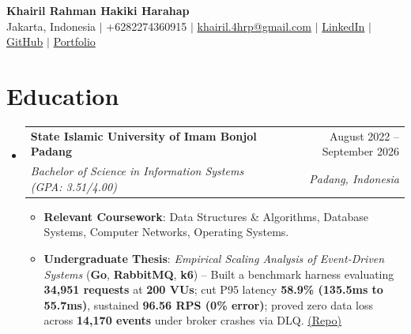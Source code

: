 \documentclass[letterpaper,11pt]{article}
\makeatletter
\newcommand{\resumeItem}[1]{\item\small{#1}}
\newcommand{\resumeSubheading}[4]{
  \item
    \begin{tabular*}{\textwidth}[t]{l@{\extracolsep{\fill}}r}
      \textbf{#1} & #2 \\
      \textit{\small#3} & \textit{\small #4} \\
    \end{tabular*}\vspace{-2pt}
}
\newcommand{\resumeSubHeadingListStart}{\begin{itemize}[leftmargin=0in, label={}, itemsep=0.5pt, parsep=0pt, topsep=0.2pt]}
\newcommand{\resumeSubHeadingListEnd}{\end{itemize}\vspace{-2pt}}
\newcommand{\resumeItemListStart}{\begin{itemize}[leftmargin=12pt, label=\tiny$\bullet$, itemsep=0.5pt, parsep=0pt, topsep=0.2pt]}
\newcommand{\resumeItemListEnd}{\end{itemize}}
\makeatother
\begin{document}
\begin{center}\vspace*{-4pt}
    {\LARGE \bfseries Khairil Rahman Hakiki Harahap} \\[2pt]
    \footnotesize Jakarta, Indonesia $|$ +6282274360915 $|$ \href{mailto:khairil.4hrp@gmail.com}{khairil.4hrp@gmail.com} $|$ \href{https://linkedin.com/in/khairilrahman}{LinkedIn} $|$ \href{https://github.com/kyyril}{GitHub} $|$ \href{https://kiril.is-a.dev}{Portfolio}
\end{center}\vspace{-4pt}



\section{Education}
  \resumeSubHeadingListStart
    \resumeSubheading
      {State Islamic University of Imam Bonjol Padang}{August 2022 -- September 2026}
      {Bachelor of Science in Information Systems (GPA: 3.51/4.00)}{Padang, Indonesia}
      \resumeItemListStart
        \resumeItem{\textbf{Relevant Coursework}: Data Structures \& Algorithms, Database Systems, Computer Networks, Operating Systems.}
        \resumeItem{\textbf{Undergraduate Thesis}: \emph{Empirical Scaling Analysis of Event-Driven Systems} (\textbf{Go}, \textbf{RabbitMQ}, \textbf{k6}) -- Built a benchmark harness evaluating \textbf{34,951 requests} at \textbf{200 VUs}; cut P95 latency \textbf{58.9\% (135.5ms to 55.7ms)}, sustained \textbf{96.56 RPS (0\% error)}; proved zero data loss across \textbf{14,170 events} under broker crashes via DLQ. \href{https://repository.uinib.ac.id/34986/}{\underline{(Repo)}}}
      \resumeItemListEnd
  \resumeSubHeadingListEnd

\end{document}
